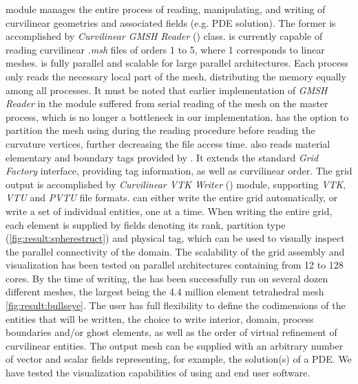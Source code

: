 \noindent
\curvgrid{} module manages the entire process of reading, manipulating, and writing of curvilinear geometries and associated fields (e.g. PDE solution). The former is accomplished by \textit{Curvilinear GMSH Reader} (\curvreader{}) class. \curvreader{} is currently capable of reading curvilinear \textit{.msh} files of orders 1 to 5, where 1 corresponds to linear meshes. \curvreader{} is fully parallel and scalable for large parallel architectures. Each process only reads the necessary local part of the mesh, distributing the memory equally among all processes. It must be noted that earlier implementation of \textit{GMSH Reader} in the \dunegrid{} module suffered from serial reading of the mesh on the master process, which is no longer a bottleneck in our implementation. \curvreader{} has the option to partition the mesh using \ParMETIS{} during the reading procedure before reading the curvature vertices, further decreasing the file access time. \curvreader{} also reads material elementary and boundary tags provided by \gmsh{}. It extends the standard \textit{Grid Factory} interface, providing tag information, as well as curvilinear order. The grid output is accomplished by \textit{Curvilinear VTK Writer} (\curvwriter{}) module, supporting \textit{VTK}, \textit{VTU} and \textit{PVTU} file formats. \curvwriter{} can either write the entire grid automatically, or write a set of individual entities, one at a time. When writing the entire grid, each element is supplied by fields denoting its rank, partition type (\cref{fig:result:spherestruct}) and physical tag, which can be used to visually inspect the parallel connectivity of the domain. The scalability of the grid assembly and visualization has been tested on parallel architectures containing from 12 to 128 cores. By the time of writing, the \curvgrid has been successfully run on several dozen different meshes, the largest being the 4.4 million element tetrahedral mesh \cref{fig:result:bullseye}. The user has full flexibility to define the codimensions of the entities that will be written, the choice to write interior, domain, process boundaries and/or ghost elements, as well as the order of virtual refinement of curvilinear entities. The output mesh can be supplied with an arbitrary number of vector and scalar fields representing, for example, the solution(s) of a PDE. We have tested the visualization capabilities of \curvgrid{} using \ParaView{} \cite{johnson+2005} and \visit{} \cite{childs+2012} end user software. \\

